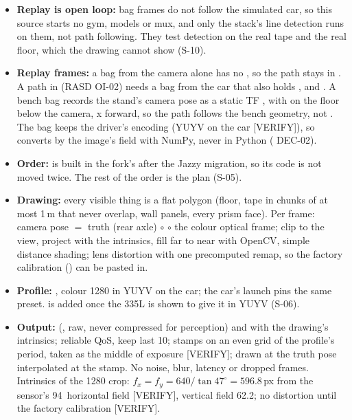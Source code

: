 \documentclass[11pt,a4paper]{article}
\begin{document}
\begin{itemize}
  \item \textbf{Replay is open loop:} bag frames do not follow the simulated car, so this source starts no gym, models or mux, and only the stack's line detection runs on them, not path following. They test detection on the real tape and the real floor, which the drawing cannot show (S-10).
  \item \textbf{Replay frames:} a bag from the camera alone has no , so the path stays in . A path in  (RASD OI-02) needs a bag from the car that also holds ,  and . A bench bag records the stand's camera pose as a static TF \arrowto{}, with  on the floor below the camera, x forward, so the path follows the bench geometry, not . The bag keeps the driver's encoding (YUYV on the car [VERIFY]), so  converts by the image's  field with NumPy, never  in Python ( DEC-02).
  \item \textbf{Order:}  is built in the fork's  after the Jazzy migration, so its code is not moved twice. The rest of the order is the  plan (S-05).
  \item \textbf{Drawing:} every visible thing is a flat polygon (floor, tape in chunks of at most 1\,m that never overlap, wall panels, every prism face). Per frame: camera pose $=$ truth (rear axle) $\circ$  $\circ$ the colour optical frame; clip to the view, project with the intrinsics, fill far to near with OpenCV, simple distance shading; lens distortion with one precomputed remap, so the factory calibration () can be pasted in.
  \item \textbf{Profile:} , colour 1280 in YUYV on the car; the car's launch pins the same preset.  is added once the 335L is shown to give it in YUYV (S-06).
  \item \textbf{Output:}  (, raw, never compressed for perception) and  with the drawing's intrinsics; reliable QoS, keep last 10; stamps on an even grid of the profile's period, taken as the middle of exposure [VERIFY]; drawn at the truth pose interpolated at the stamp. No noise, blur, latency or dropped frames. Intrinsics of the 1280 crop: $f_x = f_y = 640/\tan 47^\circ = 596.8$\,px from the sensor's 94\textdegree\ horizontal field [VERIFY], vertical field 62.2\textdegree; no distortion until the factory calibration [VERIFY].

\end{itemize}
\end{document}
